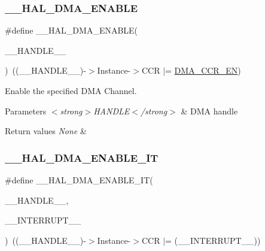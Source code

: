 \subsubsection{\texorpdfstring{\+\_\+\+\_\+\+H\+A\+L\+\_\+\+D\+M\+A\+\_\+\+E\+N\+A\+B\+LE}{\_\_HAL\_DMA\_ENABLE}}
{\footnotesize\ttfamily \#define \+\_\+\+\_\+\+H\+A\+L\+\_\+\+D\+M\+A\+\_\+\+E\+N\+A\+B\+LE(\begin{DoxyParamCaption}\item[{}]{\+\_\+\+\_\+\+H\+A\+N\+D\+L\+E\+\_\+\+\_\+ }\end{DoxyParamCaption})~((\+\_\+\+\_\+\+H\+A\+N\+D\+L\+E\+\_\+\+\_\+)-\/$>$Instance-\/$>$C\+CR $\vert$= \hyperlink{group___peripheral___registers___bits___definition_gababa3817d21a78079be76bc26b2c10f2}{D\+M\+A\+\_\+\+C\+C\+R\+\_\+\+EN})}



Enable the specified D\+MA Channel. 


\begin{DoxyParams}{Parameters}
{\em $<$strong$>$\+H\+A\+N\+D\+L\+E$<$/strong$>$} & D\+MA handle \\
\hline
\end{DoxyParams}

\begin{DoxyRetVals}{Return values}
{\em None} & \\
\hline
\end{DoxyRetVals}
\mbox{\label{group___d_m_a___exported___macros_ga2124233229c04ca90b790cd8cddfa98b}} 
\subsubsection{\texorpdfstring{\+\_\+\+\_\+\+H\+A\+L\+\_\+\+D\+M\+A\+\_\+\+E\+N\+A\+B\+L\+E\+\_\+\+IT}{\_\_HAL\_DMA\_ENABLE\_IT}}
{\footnotesize\ttfamily \#define \+\_\+\+\_\+\+H\+A\+L\+\_\+\+D\+M\+A\+\_\+\+E\+N\+A\+B\+L\+E\+\_\+\+IT(\begin{DoxyParamCaption}\item[{}]{\+\_\+\+\_\+\+H\+A\+N\+D\+L\+E\+\_\+\+\_\+,  }\item[{}]{\+\_\+\+\_\+\+I\+N\+T\+E\+R\+R\+U\+P\+T\+\_\+\+\_\+ }\end{DoxyParamCaption})~((\+\_\+\+\_\+\+H\+A\+N\+D\+L\+E\+\_\+\+\_\+)-\/$>$Instance-\/$>$C\+CR $\vert$= (\+\_\+\+\_\+\+I\+N\+T\+E\+R\+R\+U\+P\+T\+\_\+\+\_\+))}



